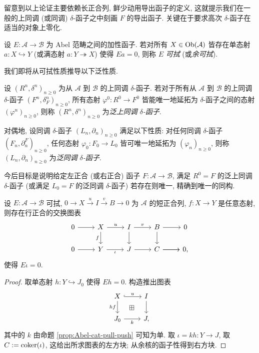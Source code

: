 留意到以上论证主要依赖长正合列, 鲜少动用导出函子的定义, 这就提示我们在一般的上同调 (或同调) $\delta$-函子之中刻画 $F$ 的导出函子. 关键在于要求高次 $\delta$-函子在适当的对象上零化.

\begin{definition}[A.\ Grothendieck]\label{def:erasable}
	设 $E: \mathcal{A} \to \mathcal{B}$ 为 Abel 范畴之间的加性函子. 若对所有 $X \in \operatorname{Ob}(\mathcal{A})$ 皆存在单态射 $a: X \hookrightarrow Y$ (或满态射 $a: Y \twoheadrightarrow X$) 使得 $Ea = 0$, 则称 $E$ \emph{可拭} (或\emph{余可拭}).
\end{definition}

我们即将从可拭性质推导以下泛性质.

\begin{definition}\label{def:universal-delta-functor}
	设 $(R^n, \delta^n)_{n \geq 0}$ 为从 $\mathcal{A}$ 到 $\mathcal{B}$ 的上同调 $\delta$-函子. 若对于所有从 $\mathcal{A}$ 到 $\mathcal{B}$ 的上同调 $\delta$-函子 $(F^n, \delta_F^n)_{n \geq 0}$, 所有态射 $\varphi^0: R^0 \to F^0$ 皆能唯一地延拓为 $\delta$-函子之间的态射 $(\varphi^n)_{n \geq 0}$, 则称 $(R^n, \delta^n)_{n \geq 0}$ 为\emph{泛上同调 $\delta$-函子}.
	
	对偶地, 设同调 $\delta$-函子 $(L_n, \partial_n)_{n \geq 0}$ 满足以下性质: 对任何同调 $\delta$-函子 $(F_n, \partial^F_n)_{n \geq 0}$, 任何态射 $\varphi_0: F_0 \to L_0$ 皆可唯一地延拓为 $(\varphi_n)_{n \geq 0}$, 则称 $(L_n, \partial_n)_{n \geq 0}$ 为\emph{泛同调 $\delta$-函子}.
\end{definition}

今后目标是说明给定左正合 (或右正合) 函子 $F: \mathcal{A} \to \mathcal{B}$, 满足 $R^0 = F$ 的泛上同调 $\delta$-函子 (或满足 $L_0 = F$ 的泛同调 $\delta$-函子) 若存在则唯一, 精确到唯一的同构.

\begin{lemma}\label{prop:erasable-aux}
	设 $E: \mathcal{A} \to \mathcal{B}$ 可拭, $0 \to X \xrightarrow{u} I \xrightarrow{v} B \to 0$ 为 $\mathcal{A}$ 的短正合列, $f: X \to Y$ 是任意态射, 则存在行正合的交换图表
	\begin{equation*}\begin{tikzcd}
			0 \arrow[r] & X \arrow[d, "f"'] \arrow[r, "u"] & I \arrow[r, "v"] \arrow[d] & B \arrow[d] \arrow[r] & 0 \\
			0 \arrow[r] & Y \arrow[r, "\iota"'] & J \arrow[r] & \arrow[r] C \arrow[r] & 0 ,
	\end{tikzcd}\end{equation*}
	使得 $E\iota = 0$.
\end{lemma}
\begin{proof}
	取单态射 $h: Y \hookrightarrow J_0$ 使得 $Eh = 0$. 构造推出图表
	\[\begin{tikzcd}
		X \arrow[hookrightarrow, r, "u"] \arrow[d, "hf"'] & I \arrow[d] \\
		J_0 \arrow[r, "k"'] & J \arrow[phantom, lu, "\boxplus" description] ,
	\end{tikzcd}\]
	其中的 $k$ 由命题 \ref{prop:Abel-cat-pull-push} 可知为单. 取 $\iota = kh: Y \to J$, 取 $C := \operatorname{coker}(\iota)$, 这给出所求图表的左方块; 从余核的函子性得到右方块.
\end{proof}

